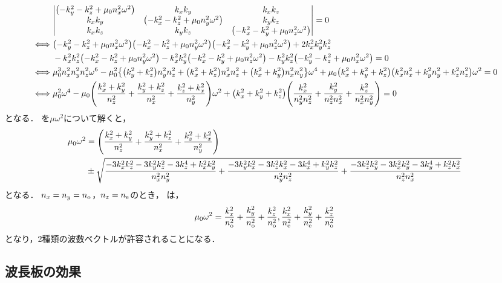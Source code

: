 \documentclass{report}
\begin{document}
    \begin{align}
      &\mqty|
        \qty(-k^2_y - k^2_z + \mu_0n^2_x\omega^2) & k_xk_y & k_xk_z \\ 
        k_xk_y & \qty(-k^2_x - k^2_z + \mu_0n^2_y\omega^2) & k_yk_z \\ 
        k_xk_z &  k_yk_z & \qty(-k^2_x - k^2_y + \mu_0n^2_z\omega^2) \\ 
      | = 0 \\ 
      \iff &\qty(-k^2_y - k^2_z + \mu_0n^2_x\omega^2)\qty(-k^2_x - k^2_z + \mu_0n^2_y\omega^2)\qty(-k^2_x - k^2_y + \mu_0n^2_z\omega^2) + 2k^2_xk^2_yk^2_z \notag \\
      &- k^2_xk^2_z\qty(-k^2_x - k^2_z + \mu_0n^2_y\omega^2) - k^2_xk^2_y\qty(-k^2_x - k^2_y + \mu_0n^2_z\omega^2) - k^2_yk^2_z\qty(-k^2_y - k^2_z + \mu_0n^2_x\omega^2) = 0 \\ 
      \iff &\mu^3_0n^2_xn^2_yn^2_z\omega^6 - \mu^2_0\qty{\qty(k^2_y + k^2_z)n^2_yn^2_z + \qty(k^2_x + k^2_z)n^2_xn^2_z +\qty(k^2_x + k^2_y)n^2_xn^2_y}\omega^4 + \mu_0\qty(k^2_x + k^2_y + k^2_z)\qty(k^2_xn^2_x + k^2_yn^2_y + k^2_zn^2_z)\omega^2 = 0 \\ 
      \iff &\mu^2_0\omega^4 - \mu_0\qty(\frac{k^2_x + k^2_y}{n^2_z} + \frac{k^2_y + k^2_z}{n^2_x} + \frac{k^2_z + k^2_x}{n^2_y})\omega^2 + \qty(k^2_x + k^2_y + k^2_z)\qty(\frac{k^2_x}{n^2_yn^2_z} + \frac{k^2_y}{n^2_zn^2_x} + \frac{k^2_z}{n^2_xn^2_y}) = 0 \label{o-e-eq}
    \end{align}
    となる．
    を$\mu\omega^2$について解くと，
    \begin{align}
      \mu_0\omega^2 &= \qty(\frac{k^2_x + k^2_y}{n^2_z} + \frac{k^2_y + k^2_z}{n^2_x} + \frac{k^2_z + k^2_x}{n^2_y}) \notag\\
      &\pm \sqrt{\frac{-3k^2_xk^2_z - 3k^2_yk^2_z - 3k^4_z + k^2_xk^2_y}{n^2_xn^2_y} + \frac{-3k^2_yk^2_x - 3k^2_zk^2_x - 3k^4_x + k^2_yk^2_z}{n^2_yn^2_z} + \frac{-3k^2_zk^2_y - 3k^2_xk^2_y - 3k^4_y + k^2_zk^2_x}{n^2_zn^2_x}} \label{mu-omega-solution}
    \end{align}
    となる．
    $n_x = n_y = n_{\mathrm{o}}$，$n_z = n_{\mathrm{e}}$のとき，
    は，
    \begin{align}
      \mu_0\omega^2 = \frac{k^2_x}{n^2_{\mathrm{o}}} + \frac{k^2_y}{n^2_{\mathrm{o}}} + \frac{k^2_z}{n^2_{\mathrm{o}}}, \frac{k^2_x}{n^2_{\mathrm{e}}} + \frac{k^2_y}{n^2_{\mathrm{e}}} + \frac{k^2_z}{n^2_{\mathrm{o}}}
    \end{align}
    となり，2種類の波数ベクトルが許容されることになる．
  \subsection{波長板の効果}
\end{document}
